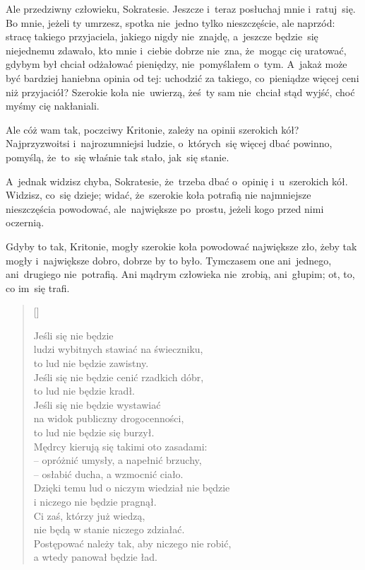 
 Ale przedziwny człowieku, Sokratesie. Jeszcze i~teraz posłuchaj mnie i~ratuj~się. Bo mnie, jeżeli ty umrzesz, spotka nie~jedno tylko nieszczęście, ale naprzód: stracę takiego przyjaciela, jakiego nigdy nie~znajdę, a~jeszcze będzie~się niejednemu zdawało, kto mnie i~ciebie dobrze nie~zna, że~mogąc cię uratować, gdybym był chciał odżałować pieniędzy, nie~pomyślałem o~tym. A~jakaż może być bardziej haniebna opinia od tej: uchodzić za takiego, co~pieniądze więcej ceni niż przyjaciół? Szerokie koła nie~uwierzą, żeś~ty sam nie~chciał stąd wyjść, choć myśmy cię nakłaniali.

 Ale cóż wam tak, poczciwy Kritonie, zależy na opinii szerokich kół? Najprzyzwoitsi i~najrozumniejsi ludzie, o~których~się więcej dbać powinno, pomyślą, że~to~się właśnie tak stało, jak~się stanie.

 A~jednak widzisz chyba, Sokratesie, że~trzeba dbać o~opinię i~u~szerokich kół. Widzisz, co~się dzieje; widać, że~szerokie koła potrafią nie najmniejsze nieszczęścia powodować, ale~największe po~prostu, jeżeli kogo przed nimi oczernią.

 Gdyby to tak, Kritonie, mogły szerokie koła powodować największe zło, żeby tak mogły i~największe dobro, dobrze by to było. Tymczasem one ani~jednego, ani~drugiego nie~potrafią. Ani mądrym człowieka nie~zrobią, ani~głupim; ot, to, co im~się trafi.


\settowidth{\versewidth}{ludzi wybitnych stawiać na świeczniku,}
\begin{verse}[\versewidth]

  Jeśli się nie będzie \\
  ludzi wybitnych stawiać na świeczniku, \\
  to lud nie będzie zawistny. \\
  Jeśli się nie będzie cenić rzadkich dóbr, \\
  to lud nie będzie kradł. \\
  Jeśli się nie będzie wystawiać \\
  na widok publiczny drogocenności, \\
  to lud nie będzie się burzył. \\
  Mędrcy kierują się takimi oto zasadami: \\
  -- opróżnić umysły, a napełnić brzuchy, \\
  -- osłabić ducha, a wzmocnić ciało. \\
  Dzięki temu lud o niczym wiedział nie będzie \\
  i niczego nie będzie pragnął. \\
  Ci zaś, którzy już wiedzą, \\
  nie będą w stanie niczego zdziałać. \\
  Postępować należy tak, aby niczego nie robić, \\
  a wtedy panował będzie ład.
\end{verse}


